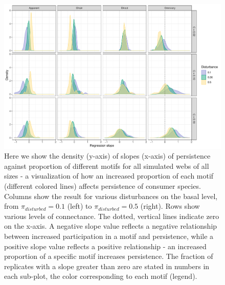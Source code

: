 \documentclass[12pt]{article}
\begin{document}
\begin{spacing}{2.0}
    \begin{figure}[hb!]
    \centering
        \includegraphics[width=\textwidth]{manuscript/figures/Fig4.pdf}
        \caption{Here we show the density (y-axis) of slopes (x-axis) of persistence against proportion of different motifs for all simulated webs of all sizes - a visualization of how an increased proportion of each motif (different colored lines) affects persistence of consumer species. Columns show the result for various disturbances on the basal level, from $\pi_{disturbed} = 0.1$ (left) to $\pi_{disturbed} = 0.5$ (right). Rows show various levels of connectance. The dotted, vertical lines indicate zero on the x-axis. A negative slope value reflects a negative relationship between increased participation in a motif and persistence, while a positive slope value reflects a positive relationship - an increased proportion of a specific motif increases persistence. The fraction of replicates with a slope greater than zero are stated in numbers in each sub-plot, the color corresponding to each motif (legend). }
        \label{fig:density_prop}
    \end{figure}    



\end{spacing}
\end{document}
